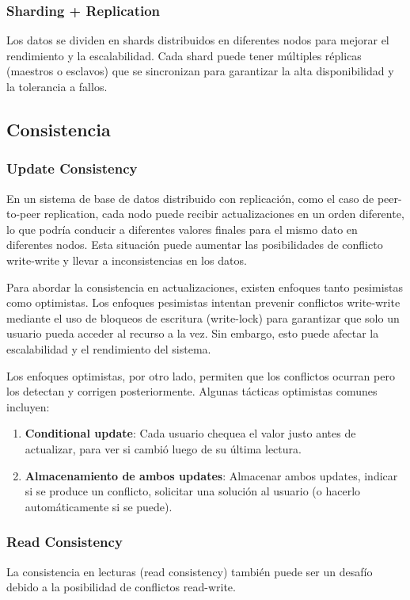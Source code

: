 \documentclass{article}
\begin{document}
		\subsubsection{Sharding + Replication}
		Los datos se dividen en shards distribuidos en diferentes nodos para mejorar el rendimiento y la escalabilidad. Cada shard puede tener múltiples réplicas (maestros o esclavos) que se sincronizan para garantizar la alta disponibilidad y la tolerancia a fallos.
		
		\subsection{Consistencia}
		\subsubsection{Update Consistency}
		En un sistema de base de datos distribuido con replicación, como el caso de peer-to-peer replication, cada nodo puede recibir actualizaciones en un orden diferente, lo que podría conducir a diferentes valores finales para el mismo dato en diferentes nodos. Esta situación puede aumentar las posibilidades de conflicto write-write y llevar a inconsistencias en los datos.
		
		Para abordar la consistencia en actualizaciones, existen enfoques tanto pesimistas como optimistas. Los enfoques pesimistas intentan prevenir conflictos write-write mediante el uso de bloqueos de escritura (write-lock) para garantizar que solo un usuario pueda acceder al recurso a la vez. Sin embargo, esto puede afectar la escalabilidad y el rendimiento del sistema.
		
		Los enfoques optimistas, por otro lado, permiten que los conflictos ocurran pero los detectan y corrigen posteriormente. 
		Algunas tácticas optimistas comunes incluyen:
		\begin{enumerate}
			\item {\textbf{Conditional update}}: Cada usuario chequea el valor justo antes de actualizar, para ver si cambió
			luego de su última lectura.
			
			\item {\textbf{Almacenamiento de ambos updates}}: Almacenar ambos updates, indicar si se produce un conflicto, solicitar
			una solución al usuario (o hacerlo automáticamente si se puede).
		\end{enumerate}
		


		\subsubsection{Read Consistency}
		La consistencia en lecturas (read consistency) también puede ser un desafío debido a la posibilidad de conflictos read-write.
		
\end{document}
